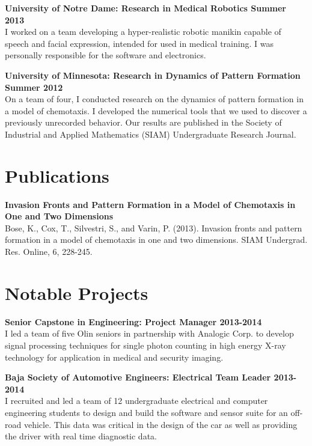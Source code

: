 \documentclass{article}
\newcommand{\newitem}[2]{\noindent\textbf{#1 \hfill #2}\\}
\newcommand{\gimmespace}{\vspace{1em}}
\begin{document}
\newitem{University of Notre Dame: Research in Medical Robotics}{Summer 2013}
I worked on a team developing a hyper-realistic robotic manikin capable of speech and facial expression, intended for used in medical training. I was personally responsible for the software and electronics.
\gimmespace

\newitem{University of Minnesota: Research in Dynamics of Pattern Formation}{Summer 2012}
On a team of four, I conducted research on the dynamics of pattern formation in a model of chemotaxis. I developed the numerical tools that we used to discover a previously unrecorded behavior. Our results are published in the Society of Industrial and Applied Mathematics (SIAM) Undergraduate Research Journal.

\section*{Publications}
\newitem{Invasion Fronts and Pattern Formation in a Model of Chemotaxis in One and Two Dimensions}{}
Bose, K., Cox, T., Silvestri, S., and Varin, P. (2013). Invasion fronts and pattern formation in a model of chemotaxis in one and two dimensions. SIAM Undergrad. Res. Online, 6, 228-245.

\section*{Notable Projects}
\newitem{Senior Capstone in Engineering: Project Manager}{2013-2014}
I led a team of five Olin seniors in partnership with Analogic Corp. to develop signal processing techniques for single photon counting in high energy X-ray technology for application in medical and security imaging.
\gimmespace

\newitem{Baja Society of Automotive Engineers: Electrical Team Leader}{2013-2014}
I recruited and led a team of 12 undergraduate electrical and computer engineering students to design and build the software and sensor suite for an off-road vehicle. This data was critical in the design of the car as well as providing the driver with real time diagnostic data.
\end{document}
